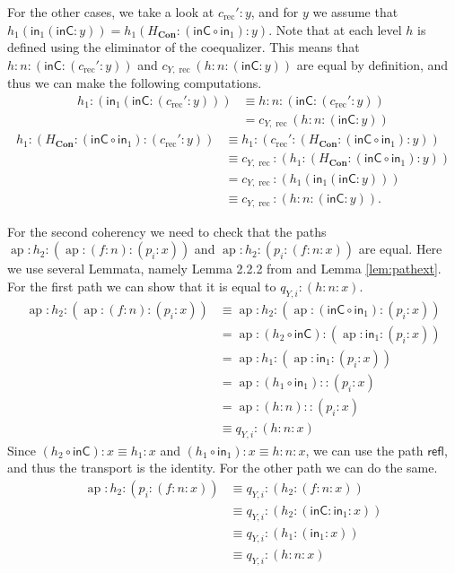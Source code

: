 \documentclass[a4paper,UKenglish]{lipics-v2016}
\newcommand{\Boperator}[1]{\mathsf{#1}}
\newcommand{\inn}{\Boperator{in}}
\newcommand{\rec}[0]{\operatorname{rec}}
\newcommand{\ap}[0]{\operatorname{ap}}
\newcommand{\Con}[0]{\textbf{Con}}
\newcommand{\refl}[0]{\Boperator{refl}}
\newcommand{\inC}[0]{\Boperator{inC}}
\begin{document}
For the other cases, we take a look at $c_{\rec}' : y$, and for $y$ we assume that $h_1(\inn_1(\inC : y)) = h_1(H_{\Con} : (\inC \circ \inn_1) : y)$.
Note that at each level $h$ is defined using the eliminator of the coequalizer.
This means that $h : n : (\inC : (c_{\rec}' : y))$ and $c_{Y, \rec}(h : n : (\inC : y))$ are equal by definition, and thus we can make the following computations.
\begin{equation*}
\begin{split}
h_1 : (\inn_1(\inC : (c_{\rec}' : y))) 
&\equiv 
h : n : (\inC : (c_{\rec}' : y))\\
&
= c_{Y, \rec} (h : n : (\inC : y))
\end{split}
\end{equation*}
\begin{equation*}
\begin{split}
h_1 : (H_{\Con} : (\inC \circ \inn_1) : (c_{\rec}' : y)) 
&\equiv 
h_1 : (c_{\rec}' : (H_{\Con} : (\inC \circ \inn_1) : y))
\\
&\equiv
c_{Y, \rec} : (h_1 : (H_{\Con} : (\inC \circ \inn_1) : y))\\
&=
c_{Y, \rec} : (h_1(\inn_1(\inC : y)))\\
&\equiv
c_{Y, \rec} : (h : n : (\inC : y)).
\end{split}
\end{equation*}


For the second coherency we need to check that the paths $\ap : h_2 : (\ap : (f : n) : (p_i : x))$ and $\ap : h_2 : (p_i : (f : n : x))$ are equal.
Here we use several Lemmata, namely Lemma 2.2.2 from \cite{hottbook} and Lemma \ref{lem:pathext}.
For the first path we can show that it is equal to $q_{Y, i} : (h : n : x)$.
\begin{equation*}
\begin{split}
\ap : h_2 : (\ap : (f : n) : (p_i : x))
&\equiv
\ap : h_2 : (\ap : (\inC \circ \inn_1) : (p_i : x))\\
&=
\ap : (h_2 \circ \inC) : (\ap : \inn_1 : (p_i : x))\\
&=
\ap : h_1 : (\ap : \inn_1 : (p_i : x))\\
&=
\ap : (h_1 \circ \inn_1) : : (p_i : x)\\
&=
\ap : (h : n) : : (p_i : x)\\
&\equiv
q_{Y, i} : (h : n : x)
\end{split}
\end{equation*}
Since $(h_2 \circ \inC) : x \equiv h_1 : x$ and $(h_1 \circ \inn_1) : x \equiv h : n : x$, we can use the path $\refl$, and thus the transport is the identity.
For the other path we can do the same.
\begin{equation*}
\begin{split}
\ap : h_2 : (p_i : (f : n : x))
&\equiv
q_{Y, i} : (h_2 : (f : n : x))\\
&\equiv
q_{Y, i} : (h_2 : (\inC : \inn_1 : x))\\
&\equiv
q_{Y, i} : (h_1 : (\inn_1 : x))\\
&\equiv
q_{Y, i} : (h : n : x)
\end{split}
\end{equation*}
\end{document}
